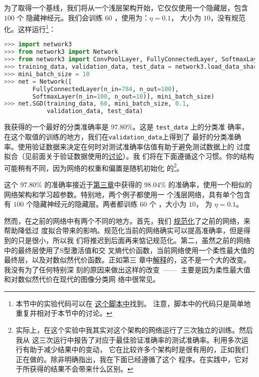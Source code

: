 为了取得一个基线，我们将从一个浅层架构开始，它仅仅使用一个隐藏层，包含 $100$ 个
隐藏神经元。我们会训练 $60$ \epochs{}，使用\learningrate{}为：$\eta = 0.1$，
\minibatch{} 大小为 $10$，没有规范化。这样运行\footnote{本节中的实验代码可以在
\href{https://github.com/mnielsen/neural-networks-and-deep-learning/blob/master/src/conv.py}{这个脚本中}找到。
注意，脚本中的代码只是简单地重复并相对于本节中的讨论。}：
\begin{lstlisting}[language=Python]
>>> import network3
>>> from network3 import Network
>>> from network3 import ConvPoolLayer, FullyConnectedLayer, SoftmaxLayer
>>> training_data, validation_data, test_data = network3.load_data_shared()
>>> mini_batch_size = 10
>>> net = Network([
        FullyConnectedLayer(n_in=784, n_out=100),
        SoftmaxLayer(n_in=100, n_out=10)], mini_batch_size)
>>> net.SGD(training_data, 60, mini_batch_size, 0.1, 
            validation_data, test_data)
\end{lstlisting}

我获得的一个最好的分类准确率是 $97.80$\%。这是 \lstinline!test_data! 上的分类准
确率，在这个取值的训练\epoch{}的地方，我们在\lstinline!validation_data!上得到了
最好的分类准确率。使用验证数据来决定在何时对测试准确率估值有助于避免测试数据上的
过度拟合（见前面关于验证数据使用的\hyperref[validation_explanation]{讨论}）。我
们将在下面遵循这个习惯。你的结构可能稍有不同，因为网络的权重和偏置是随机初始化
的\footnote{实际上，在这个实验中我其实对这个架构的网络运行了三次独立的训练。然后我从
这三次运行中报告了对应于最佳验证准确率的测试准确率。利用多次运行有助于减少结果中的变动，
它在比较许多个架构时是很有用的，正如我们正在做的。除非明确指出，我在下面已经遵循了这个
程序。在实践中，它对于所获得的结果不会带来什么区别。}。

这个 $97.80$\% 的准确率接近于\hyperref[chap3_98_04_percent]{第三章}中获得的
$98.04$\% 的准确率，使用一个相似的网络架构和学习超参数。特别地，两个例子都使用一
个浅层网络，具有单个包含有 $100$ 个隐藏神经元的隐藏层。两者都训练 $60$ 个
\epochs{}，\minibatch{}大小为 $10$，\learningrate{} 为 $\eta = 0.1$。

然而，在之前的网络中有两个不同的地方。首先，我们%
\hyperref[sec:overfitting_and_regularization]{规范化}了之前的网络，来帮助降低过
度拟合带来的影响。规范化当前的网络确实可以提高准确率，但是得到的只是很小，所以我
们将推迟到后面再来惦记规范化。第二，虽然之前的网络中的最终层使用了S型激活值和交
叉熵代价函数，当前网络使用一个柔性最大值的最终层，以及对数似然代价函数。正如第三
章中\hyperref[subsec:softmax]{解释}的，这不是一个大的改变。我没有为了任何特别深
刻的原因来做出这样的改变~——~主要是因为柔性最大值和对数似然代价在现代的图像分类网
络中很常见。

